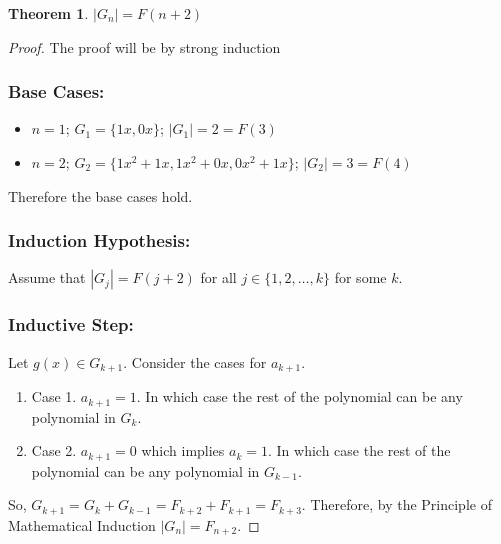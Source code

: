 \documentclass{article}
\newtheorem{theorem}{Theorem}[section]
\begin{document}
    \begin{theorem}
        $|G_n| = F(n+2)$
    \end{theorem}
    \begin{proof}
        The proof will be by strong induction
            \subsubsection*{\textbf{Base Cases:}}
            \begin{itemize}
                \item $n=1$; $G_1 =\{1x, 0x\}$; $|G_1|= 2 = F(3)$
                \item $n=2$; $G_2 =\{1x^2 + 1x, 1x^2 + 0x, 0x^2 + 1x \}$; $|G_2|= 3 = F(4)$
            \end{itemize}
            Therefore the base cases hold.
            \subsubsection*{\textbf{Induction Hypothesis:}}
                Assume that $|G_j| = F(j+2)$ for all $j \in \{1, 2, \ldots, k\}$ for some $k$.
            \subsubsection*{\textbf{Inductive Step:}}
                Let $g(x) \in G_{k+1}$. Consider the cases for $a_{k+1}$.
                \begin{enumerate}
                    \item Case 1. $a_{k+1} = 1$. In which case the rest of the polynomial can be any polynomial in $G_k$.
                    \item Case 2. $a_{k+1} = 0$ which implies $a_k = 1$. In which case the rest of the polynomial can be any polynomial in $G_{k-1}$.
                \end{enumerate}
                So, $G_{k+1} = G_k + G_{k-1} = F_{k+2} + F_{k+1} = F_{k+3}$. Therefore, by the Principle of Mathematical Induction $|G_n| = F_{n+2}$.
    \end{proof}
\end{document}
